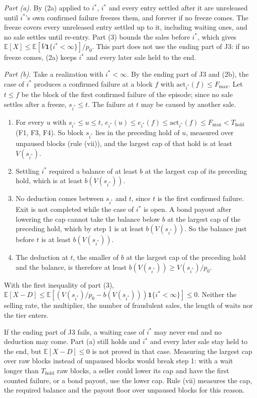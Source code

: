\documentclass[10pt,a4paper]{article}
\newcommand{\Thold}{T_{\mathrm{hold}}}
\newcommand{\Fmax}{F_{\max}}
\newcommand{\E}{\mathbb{E}}
\newcommand{\ist}{i^{*}}
\newcommand{\one}{\mathbf{1}}
\theoremstyle{plain}
\theoremstyle{remark}
\begin{document}
\emph{Part (a).} By (2a) applied to $\ist$, $\ist$ and every entry settled after it are unreleased until $\ist$'s own confirmed failure freezes them, and forever if no freeze comes. The freeze covers every unreleased entry settled up to it, including waiting ones, and no sale settles until re-entry. Part (3) bounds the sales before $\ist$, which gives $\E[X]\le\E[\bar V\one\{\ist<\infty\}]/p_0$. This part does not use the ending part of J3: if no freeze comes, (2a) keeps $\ist$ and every later sale held to the end.

\emph{Part (b).} Take a realization with $\ist<\infty$. By the ending part of J3 and (2b), the case of $\ist$ produces a confirmed failure at a block $f$ with $\mathrm{act}_{\ist}(f)\le\Fmax$. Let $t\le f$ be the block of the first confirmed failure of the episode; since no sale settles after a freeze, $s_{\ist}\le t$. The failure at $t$ may be caused by another sale.
\begin{enumerate}
\item For every $u$ with $s_{\ist}\le u\le t$, $e_{\ist}(u)\le e_{\ist}(f)\le\mathrm{act}_{\ist}(f)\le\Fmax<\Thold$ (F1, F3, F4). So block $s_{\ist}$ lies in the preceding hold of $u$, measured over unpaused blocks (rule (vii)), and the largest cap of that hold is at least $V(s_{\ist})$.
\item Settling $\ist$ required a balance of at least $b$ at the largest cap of its preceding hold, which is at least $b(V(s_{\ist}))$.
\item No deduction comes between $s_{\ist}$ and $t$, since $t$ is the first confirmed failure. Exit is not completed while the case of $\ist$ is open. A bond payout after lowering the cap cannot take the balance below $b$ at the largest cap of the preceding hold, which by step 1 is at least $b(V(s_{\ist}))$. So the balance just before $t$ is at least $b(V(s_{\ist}))$.
\item The deduction at $t$, the smaller of $b$ at the largest cap of the preceding hold and the balance, is therefore at least $b(V(s_{\ist}))\ge V(s_{\ist})/p_0$.
\end{enumerate}
With the first inequality of part (3), $\E[X-D]\le\E[(V(s_{\ist})/p_0-b(V(s_{\ist})))\one\{\ist<\infty\}]\le0$. Neither the selling rate, the multiplier, the number of fraudulent sales, the length of waits nor the tier enters.

If the ending part of J3 fails, a waiting case of $\ist$ may never end and no deduction may come. Part (a) still holds and $\ist$ and every later sale stay held to the end, but $\E[X-D]\le0$ is not proved in that case. Measuring the largest cap over raw blocks instead of unpaused blocks would break step 1: with a wait longer than $\Thold$ raw blocks, a seller could lower its cap and have the first counted failure, or a bond payout, use the lower cap. Rule (vii) measures the cap, the required balance and the payout floor over unpaused blocks for this reason.
\end{document}
